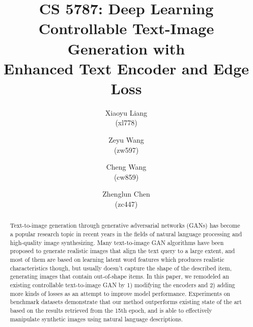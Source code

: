 \documentclass[10pt,twocolumn,letterpaper]{article}
\begin{document}
\title{CS 5787:  Deep Learning \\ Controllable Text-Image Generation with \\ Enhanced Text Encoder and Edge Loss}

\author{Xiaoyu Liang\\
(xl778)\\
\and
Zeyu Wang\\
(zw597)
\and
Cheng Wang\\
(cw859)
\and
Zhenglun Chen\\
(zc447)
}

\maketitle

\begin{abstract}
    Text-to-image generation through generative adversarial networks (GANs) has become a popular research topic in recent years in the fields of natural language processing and high-quality image synthesizing. Many text-to-image GAN algorithms have been proposed to generate realistic images that align the text query to a large extent, and most of them are based on learning latent word features which produces realistic characteristics though, but usually doesn’t capture the shape of the described item, generating images that contain out-of-shape items. In this paper, we remodeled an existing controllable text-to-image GAN  \cite{li2019controllable} by 1) modifying the encoders and 2) adding more kinds of losses as an attempt to improve model performance. Experiments on benchmark datasets demonstrate that our method outperforms existing state of the art based on the results retrieved from the 15th epoch, and is able to effectively manipulate synthetic images using natural language descriptions.
\end{abstract}
\end{document}

